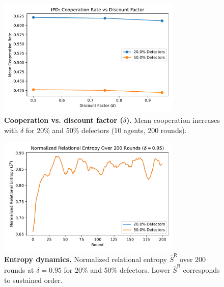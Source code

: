\documentclass[11pt]{article}
\newcommand{\SRbar}{\overline{S}^{\mathsf{R}}}
\begin{document}
\begin{figure}[t]
  \centering
  \includegraphics[width=0.78\textwidth]{ipd_chart.pdf}
  \caption{\textbf{Cooperation vs. discount factor ($\delta$).} Mean cooperation increases with $\delta$ for 20\% and 50\% defectors (10 agents, 200 rounds).}
  \label{fig:ipd}
\end{figure}

\begin{figure}[t]
  \centering
  \includegraphics[width=0.78\textwidth]{entropy_chart.pdf}
  \caption{\textbf{Entropy dynamics.} Normalized relational entropy $\SRbar$ over 200 rounds at $\delta\!=\!0.95$ for 20\% and 50\% defectors. Lower $\SRbar$ corresponds to sustained order.}
  \label{fig:sr_over_time}
\end{figure}
\end{document}
